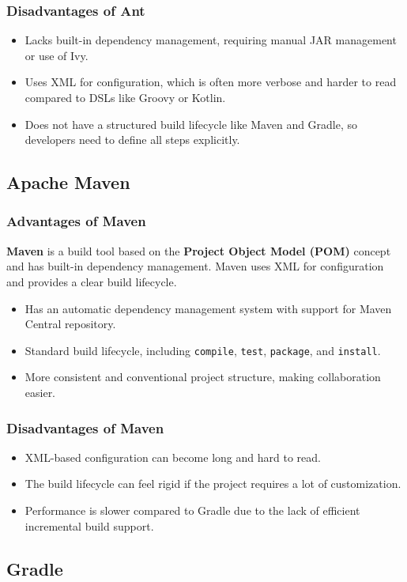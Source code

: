 \documentclass[aspectratio=169, table]{beamer}
\begin{document}
\begin{frame}[fragile]
	\frametitle{Disadvantages of Ant}
	\begin{itemize}
		\item Lacks built-in dependency management, requiring manual JAR management or use of Ivy.
		\item Uses XML for configuration, which is often more verbose and harder to read compared to DSLs like Groovy or Kotlin.
		\item Does not have a structured build lifecycle like Maven and Gradle, so developers need to define all steps explicitly.
	\end{itemize}
\end{frame}

\subsection{Apache Maven}
\begin{frame}[fragile]
	\frametitle{Advantages of Maven}
	\textbf{Maven} is a build tool based on the \textbf{Project Object Model (POM)} concept and has built-in dependency management. Maven uses XML for configuration and provides a clear build lifecycle.
	\begin{itemize}
		\item Has an automatic dependency management system with support for Maven Central repository.
		\item Standard build lifecycle, including \texttt{compile}, \texttt{test}, \texttt{package}, and \texttt{install}.
		\item More consistent and conventional project structure, making collaboration easier.
	\end{itemize}
\end{frame}

\begin{frame}[fragile]
	\frametitle{Disadvantages of Maven}
	\begin{itemize}
		\item XML-based configuration can become long and hard to read.
		\item The build lifecycle can feel rigid if the project requires a lot of customization.
		\item Performance is slower compared to Gradle due to the lack of efficient incremental build support.
	\end{itemize}
\end{frame}

\subsection{Gradle}
\end{document}
